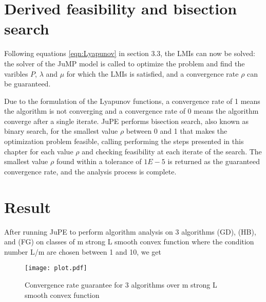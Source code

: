 \section{Derived feasibility and bisection search}
Following equations \ref{eqn:Lyapunov} in section 3.3, the LMIs can now be solved: the solver of the JuMP model is called to optimize the problem and find the varibles $P$, $\lambda$ and $\mu$ for which the LMIs is satisfied, and a convergence rate $\rho$ can be guaranteed.

Due to the formulation of the Lyapunov functions, a convergence rate of 1 means the algorithm is not converging and a convergence rate of 0 means the algorithm converge after a single iterate. JuPE performs bisection search, also known as binary search, for the smallest value $\rho$ between 0 and 1 that makes the optimization problem feasible, calling performing the steps presented in this chapter for each value $\rho$ and checking feasibility at each iterate of the search. The smallest value $\rho$ found within a tolerance of $1E-5$ is returned as the guaranteed convergence rate, and the analysis process is complete.

\section{Result}
After running JuPE to perform algorithm analysis on 3 algorithms (GD), (HB), and (FG) on classes of m strong L smooth convex function where the condition number L/m are chosen between 1 and 10, we get 
\begin{figure}[h]
    \centering
    \texttt{[image: plot.pdf]}
    \caption{Convergence rate guarantee for 3 algorithms over m strong L smooth convex function}
    \label{plot_result}
\end{figure}

